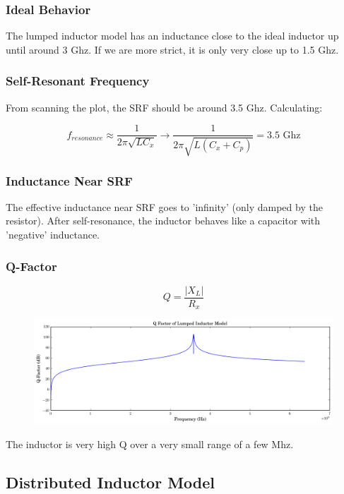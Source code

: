 \documentclass[11pt]{article}
\begin{document}
\subsubsection{Ideal Behavior}
The lumped inductor model has an inductance close to the ideal inductor up until around 3 Ghz. If we are more strict, it is only very close up to 1.5 Ghz.

\subsubsection{Self-Resonant Frequency}
From scanning the plot, the SRF should be around 3.5 Ghz. Calculating:

\begin{equation*}
	f_{resonance} \approx \frac{1}{2 \pi \sqrt{L C_{x}}} \rightarrow \frac{1}{2 \pi \sqrt{L (C_{x} + C_p)}} = 3.5 \text{ Ghz}
\end{equation*}

\subsubsection{Inductance Near SRF}
The effective inductance near SRF goes to 'infinity' (only damped by the resistor). After self-resonance, the inductor behaves like a capacitor with 'negative' inductance.

\subsubsection{Q-Factor}
\begin{equation*}
	Q = \frac{|X_L|}{R_x}
\end{equation*}
\begin{figure}[H]
	\centering \includegraphics[width=\textwidth]{images/inductor_q.png}
\end{figure}

The inductor is very high Q over a very small range of a few Mhz.

\subsection{Distributed Inductor Model}
\end{document}
